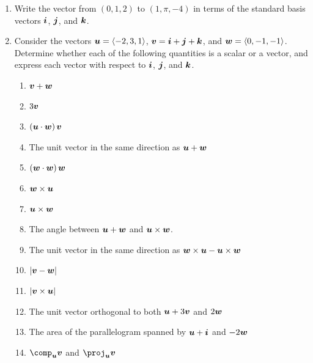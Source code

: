 \documentclass[12 pt]{article}
\begin{document}
\begin{enumerate}[leftmargin=0in, rightmargin=-0.25in]
	\item Write the vector from $(0,1,2)$ to $(1,\pi,-4)$ in terms of the standard basis vectors $\boldsymbol{i}$, $\boldsymbol{j}$, and $\boldsymbol{k}$.
	
	\item Consider the vectors $\boldsymbol{u}=\langle -2,3,1\rangle$, $\boldsymbol{v}=\boldsymbol{i}+\boldsymbol{j}+\boldsymbol{k}$, and $\boldsymbol{w}=\langle 0,-1,-1 \rangle$. Determine whether each of the following quantities is a scalar or a vector, and express each vector with respect to $\boldsymbol{i}$, $\boldsymbol{j}$, and $\boldsymbol{k}$.
	\begin{enumerate}
		\item $\boldsymbol{v}+\boldsymbol{w}$
		\item $3\boldsymbol{v}$
		\item $\left(\boldsymbol{u}\cdot\boldsymbol{w}\right)\boldsymbol{v}$
		\item The unit vector in the same direction as $\boldsymbol{u}+\boldsymbol{w}$
		\item $\left(\boldsymbol{w}\cdot\boldsymbol{w}\right)\boldsymbol{w}$
		\item $\boldsymbol{w}\times\boldsymbol{u}$
		\item $\boldsymbol{u}\times\boldsymbol{w}$
		\item The angle between $\boldsymbol{u}+\boldsymbol{w}$ and $\boldsymbol{u}\times\boldsymbol{w}$.
		\item The unit vector in the same direction as $\boldsymbol{w}\times\boldsymbol{u}-\boldsymbol{u}\times\boldsymbol{w}$
		\item $|\boldsymbol{v}-\boldsymbol{w}|$
		\item $|\boldsymbol{v}\times\boldsymbol{u}|$
		\item The unit vector orthogonal to both $\boldsymbol{u}+3\boldsymbol{v}$ and $2\boldsymbol{w}$
		\item The area of the parallelogram spanned by $\boldsymbol{u}+\boldsymbol{i}$ and $-2\boldsymbol{w}$
		\item $\comp_{\vect{u}}\vect{v}$ and $\proj_{\vect{u}}\vect{v}$ 
	\end{enumerate}


\end{enumerate}
\end{document}
